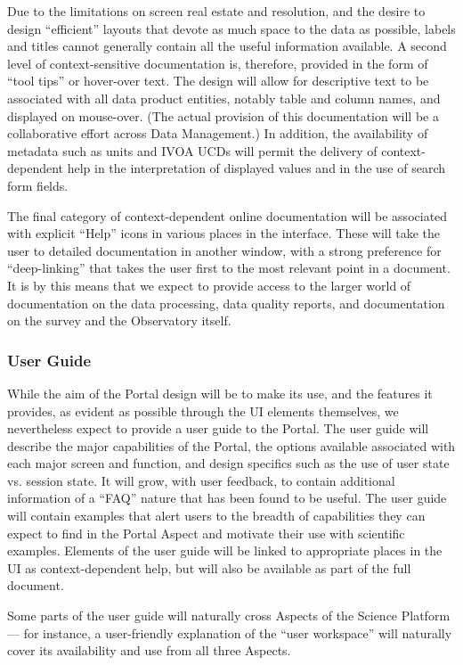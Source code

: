 Due to the limitations on screen real estate and resolution, and the desire to design ``efficient'' layouts that devote as much space to the data as possible, labels and titles cannot generally contain all the useful information available.
A second level of context-sensitive documentation is, therefore, provided in the form of ``tool tips'' or hover-over text.
The design will allow for descriptive text to be associated with all data product entities, notably table and column names, and displayed on mouse-over.
(The actual provision of this documentation will be a collaborative effort across Data Management.)
In addition, the availability of metadata such as units and IVOA UCDs will permit the delivery of context-dependent help in the interpretation of displayed values and in the use of search form fields.

The final category of context-dependent online documentation will be associated with explicit ``Help'' icons in various places in the interface.
These will take the user to detailed documentation in another window, with a strong preference for ``deep-linking'' that takes the user first to the most relevant point in a document.
It is by this means that we expect to provide access to the larger world of documentation on the data processing, data quality reports, and documentation on the survey and the Observatory itself. 

\subsubsection{User Guide}\label{user-guide}

While the aim of the Portal design will be to make its use, and the features it provides, as evident as possible through the UI elements themselves, we nevertheless expect to provide a user guide to the Portal.
The user guide will describe the major capabilities of the Portal, the options available associated with each major screen and function, and design specifics such as the use of user state vs. session state.
It will grow, with user feedback, to contain additional information of a ``FAQ'' nature that has been found to be useful.
The user guide will contain examples that alert users to the breadth of capabilities they can expect to find in the Portal Aspect and motivate their use with scientific examples.
Elements of the user guide will be linked to appropriate places in the UI as context-dependent help, but will also be available as part of the full document.

Some parts of the user guide will naturally cross Aspects of the Science Platform --- for instance, a user-friendly explanation of the ``user workspace'' will naturally cover its availability and use from all three Aspects.

